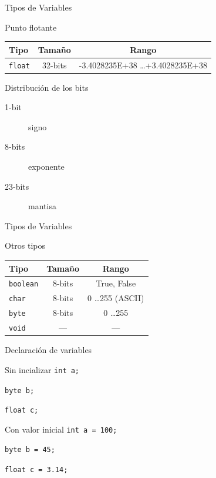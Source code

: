 \documentclass[xcolor=dvipsnames]{beamer}
\begin{document}
\begin{frame}{Tipos de Variables}
 \begin{block}{Punto flotante}
 \begin{tabular}{lcc}\hline
 	Tipo	& 	 Tamaño & Rango \\\hline\hline
{\tt float} &  32-bits & -3.4028235E+38 \ldots +3.4028235E+38 \\\hline
 \end{tabular}
 \end{block}
 \begin{block}{Distribución de los bits}
 \begin{description}
 \item[1-bit] signo
 \item[8-bits] exponente
 \item[23-bits] mantisa
  \end{description}
 \end{block}
\end{frame}

\begin{frame}{Tipos de Variables}
\begin{block}{Otros tipos}
\begin{center}
 \begin{tabular}{lcc}\hline
 	Tipo	& 	 Tamaño & Rango \\\hline\hline
{\tt boolean} &  8-bits & True, False \\\hline
{\tt char} &  8-bits & 0 \ldots 255 (ASCII) \\\hline
{\tt byte} &  8-bits & 0 \ldots 255 \\\hline
{\tt void} & --- & --- \\\hline
 \end{tabular}
\end{center}
\end{block}
\end{frame}

\begin{frame}{Declaración de variables}
\begin{block}{Sin incializar}
{\tt int a;}

{\tt byte b;}

{\tt float c;}
\end{block}
\begin{block}{Con valor inicial}
{\tt int a = 100;}

{\tt byte b = 45;}

{\tt float c = 3.14;}
\end{block}
\end{frame}
\end{document}
